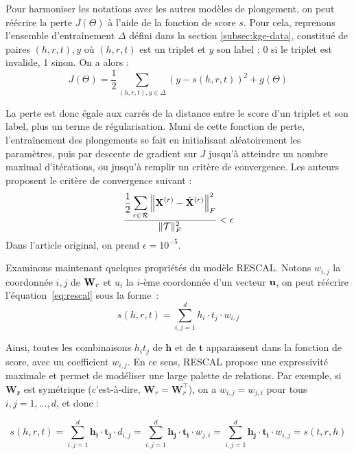 Pour harmoniser les notations avec les autres modèles de plongement, on peut réécrire la perte $J(\Theta)$ à l'aide de la fonction de score $s$. Pour cela,
reprenons l'ensemble d'entraînement $\Delta$ défini dans la section \ref{subsec:kge-data}, constitué de paires $(h, r, t), y$ où $(h, r, t)$ est un triplet et $y$ son label : 0 si le triplet est invalide, 1 sinon.
On a alors :
\begin{equation}
    J(\Theta) = \frac{1}{2} \sum_{(h, r, t), y \in \Delta} \left(y - s(h, r, t) \right)^2
    + g(\Theta)
\end{equation}

La perte est donc égale aux carrés de la distance entre le score d'un triplet et son label, plus un terme de régularisation. Muni de cette fonction de perte, l'entraînement des plongements se fait en initialisant aléatoirement les paramètres, puis par descente de gradient sur $J$ jusqu'à atteindre un nombre maximal d'itérations, ou jusqu'à remplir un critère de convergence. Les auteurs proposent le critère de convergence suivant :
\begin{equation}
    \frac{\displaystyle \frac{1}{2} \sum_{r \in \Rel} \left\| \bf{X}^{(r)} - \hat{\bf{X}}^{(r)} \right\|_F^2}{\| \cal{T} \|_F^2} < \epsilon
\end{equation}
Dans l'article original, on prend $\epsilon = 10^{-5}$.


Examinons maintenant quelques propriétés du modèle RESCAL. Notons $w_{i, j}$ la coordonnée $i,j$ de $\bf{W}_r$ et $u_i$ la $i$-ème coordonnée d'un vecteur $\bf{u}$, on peut réécrire l'équation~\ref{eq:rescal} sous la forme~:
\begin{equation}
    s(h, r, t) = \sum_{i, j = 1}^{d} h_i \cdot t_j \cdot w_{i, j}
\end{equation}

Ainsi, toutes les combinaisons $h_i t_j$ de $\mathbf{h}$ et de $\mathbf{t}$ apparaissent dans la fonction de score, avec un coefficient $w_{i, j}$. En ce sens, RESCAL propose une expressivité maximale et permet de modéliser une large palette de relations. Par exemple, si $\mathbf{W_r}$ est symétrique (c'est-à-dire, $\mathbf{W}_r = \mathbf{W}_r^\top$), on a $w_{i,j} = w_{j, i}$ pour tous $i, j = 1, \ldots, d$, et donc :

\begin{equation}
    s(h, r, t) = \sum_{i, j = 1}^{d} \mathbf{h_i \cdot t_j} \cdot d_{i, j}
    =  \sum_{i, j = 1}^{d} \mathbf{h_j \cdot t_i} \cdot w_{j, i}
    =  \sum_{i, j = 1}^{d} \mathbf{h_j \cdot t_i} \cdot w_{i, j}
    = s(t, r, h)
\end{equation}

